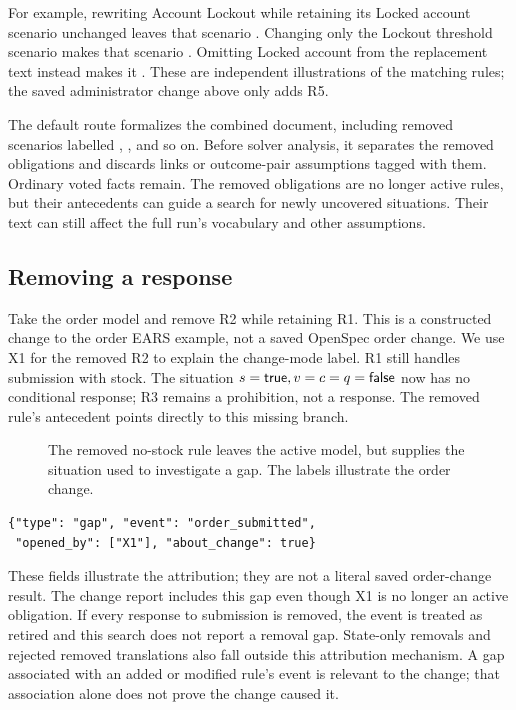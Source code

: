 For example, rewriting Account Lockout while retaining its Locked account scenario unchanged leaves that scenario . Changing only the Lockout threshold scenario makes that scenario . Omitting Locked account from the replacement text instead makes it . These are independent illustrations of the matching rules; the saved administrator change above only adds R5.

The default route formalizes the combined document, including removed scenarios labelled , , and so on. Before solver analysis, it separates the removed obligations and discards links or outcome-pair assumptions tagged with them. Ordinary voted facts remain. The removed obligations are no longer active rules, but their antecedents can guide a search for newly uncovered situations. Their text can still affect the full run's vocabulary and other assumptions.

\subsection{Removing a response}

Take the order model and remove R2 while retaining R1. This is a constructed change to the order EARS example, not a saved OpenSpec order change. We use X1 for the removed R2 to explain the change-mode label. R1 still handles submission with stock. The situation $s=\mathsf{true},v=c=q=\mathsf{false}$ now has no conditional response; R3 remains a prohibition, not a response. The removed rule's antecedent points directly to this missing branch.

\begin{figure}[H]
\centering
\resizebox{0.94\linewidth}{!}{}
\caption{The removed no-stock rule leaves the active model, but supplies the situation used to investigate a gap. The labels illustrate the order change.}\label{fig:removal}
\end{figure}

\begin{lstlisting}
{"type": "gap", "event": "order_submitted",
 "opened_by": ["X1"], "about_change": true}
\end{lstlisting}
These fields illustrate the attribution; they are not a literal saved order-change result. The change report includes this gap even though X1 is no longer an active obligation. If every response to submission is removed, the event is treated as retired and this search does not report a removal gap. State-only removals and rejected removed translations also fall outside this attribution mechanism. A gap associated with an added or modified rule's event is relevant to the change; that association alone does not prove the change caused it.

